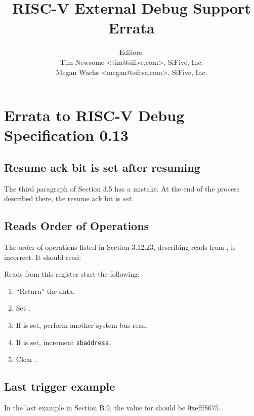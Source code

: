 \documentclass[twoside,11pt]{article}
\newenvironment{steps}[1]
  {
     \vspace{1ex}
     \noindent #1
     \begin{enumerate}[nolistsep]
  }
  {
     \end{enumerate}
     \vspace{1ex}
 }
\begin{document}
\title{RISC-V External Debug Support Errata\\
\GITHash
}
\author{Editors: \\
Tim Newsome \textless tim@sifive.com\textgreater, SiFive, Inc. \\
Megan Wachs \textless megan@sifive.com\textgreater, SiFive, Inc.}
\date{\GITAuthorDate}
\maketitle

\section{Errata to RISC-V Debug Specification 0.13}

\subsection{Resume ack bit is set after resuming}

The third paragraph of Section 3.5 has a mistake. At the end of the process
described there, the resume ack bit is \emph{set}.

\subsection{\Rsbdatazero Reads Order of Operations}

The order of operations listed in Section 3.12.23, describing reads from
\Rsbdatazero, is incorrect. It should read:

\begin{steps}{Reads from this register start the following:}
    \item ``Return'' the data.
    \item Set \Fsbbusy.
    \item If \Fsbreadondata is set, perform another system bus read.
    \item If \Fsbautoincrement is set, increment {\tt sbaddress}.
    \item Clear \Fsbbusy.
\end{steps}

\subsection{Last trigger example}

In the last example in Section B.9, the value for  should be
0xefff8675.
\end{document}
